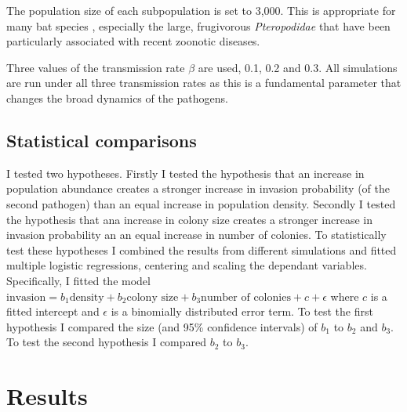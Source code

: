 The population size of each subpopulation is set to 3,000. 
This is appropriate for many bat species \cite{jones2009pantheria}, especially the large, frugivorous \emph{Pteropodidae} that have been particularly associated with recent zoonotic diseases.


Three values of the transmission rate $\beta$ are used, 0.1, 0.2 and 0.3.
All simulations are run under all three transmission rates as this is a fundamental parameter that changes the broad dynamics of the pathogens.


\subsection{Statistical comparisons}

I tested two hypotheses.
Firstly I tested the hypothesis that an increase in population abundance creates a stronger increase in invasion probability (of the second pathogen) than an equal increase in population density.
Secondly I tested the hypothesis that ana increase in colony size creates a stronger increase in invasion probability an an equal increase in number of colonies.
To statistically test these hypotheses I combined the results from different simulations and fitted multiple logistic regressions, centering and scaling the dependant variables.
Specifically, I fitted the model $\text{invasion} = b_1 \text{density} + b_2 \text{colony size} + b_3 \text{number of colonies} + c + \epsilon$ where $c$ is a fitted intercept and $\epsilon$ is a binomially distributed error term.
To test the first hypothesis I compared the size (and 95\% confidence intervals) of $b_1$ to $b_2$ and $b_3$.
To test the second hypothesis I compared $b_2$ to $b_3$.










\section{Results}























